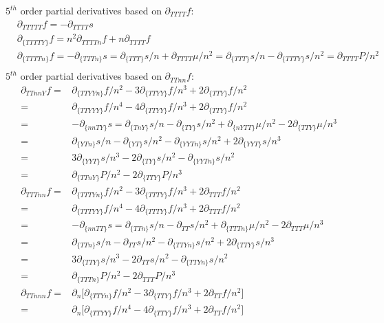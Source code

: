 \documentclass[11pt,letter]{article}
\begin{document}
$5^{th}$ order partial derivatives based on $\partial_{TTTT}f$:
\begin{equation}
 \begin{split}
  &\partial_{TTTTT}f=-\partial_{TTTT}s\\
  &\partial_{\{TTTTY\}}f=n^2\partial_{TTTTn}f+n\partial_{TTTT}f\\
  &\partial_{\{TTTTn\}}f=-\partial_{\{TTTn\}}s=\partial_{\{TTT\}}s/n+\partial_{TTTT}\mu/n^2=\partial_{\{TTT\}}s/n-\partial_{\{TTTY\}}s/n^2=\partial_{TTTT}P/n^2\\
 \end{split}
\end{equation}
$5^{th}$ order partial derivatives based on $\partial_{TTnn}f$:
\begin{equation}
 \begin{split}
  \partial_{TTnnY}f=&\partial_{\{TTYYn\}}f/n^2-3\partial_{\{TTYY\}}f/n^3+2\partial_{\{TTY\}}f/n^2\\
  =&\partial_{\{TTYYY\}}f/n^4-4\partial_{\{TTYY\}}f/n^3+2\partial_{\{TTY\}}f/n^2\\
  =&-\partial_{\{nnTY\}}s=\partial_{\{TnY\}}s/n-\partial_{\{TY\}}s/n^2+\partial_{\{nYTT\}}\mu/n^2-2\partial_{\{TTY\}}\mu/n^3\\
  =&\partial_{\{YTn\}}s/n-\partial_{\{YT\}}s/n^2-\partial_{\{YYTn\}}s/n^2+2\partial_{\{YYT\}}s/n^3\\
  =&3\partial_{\{YYT\}}s/n^3-2\partial_{\{TY\}}s/n^2-\partial_{\{YYTn\}}s/n^2\\
  =&\partial_{\{TTnY\}}P/n^2-2\partial_{\{TTY\}}P/n^3\\
  \partial_{TTTnn}f=&\partial_{\{TTTYn\}}f/n^2-3\partial_{\{TTTY\}}f/n^3+2\partial_{TTT}f/n^2\\
  =&\partial_{\{TTTYY\}}f/n^4-4\partial_{\{TTTY\}}f/n^3+2\partial_{TTT}f/n^2\\
  =&-\partial_{\{nnTT\}}s=\partial_{\{TTn\}}s/n-\partial_{TT}s/n^2+\partial_{\{TTTn\}}\mu/n^2-2\partial_{TTT}\mu/n^3\\
  =&\partial_{\{TTn\}}s/n-\partial_{TT}s/n^2-\partial_{\{TTYn\}}s/n^2+2\partial_{\{TTY\}}s/n^3\\
  =&3\partial_{\{TTY\}}s/n^3-2\partial_{TT}s/n^2-\partial_{\{TTYn\}}s/n^2\\
  =&\partial_{\{TTTn\}}P/n^2-2\partial_{TTT}P/n^3\\
  \partial_{TTnnn}f=&\partial_{n}\big[\partial_{\{TTYn\}}f/n^2-3\partial_{\{TTY\}}f/n^3+2\partial_{TT}f/n^2\big]\\
  =&\partial_{n} \big[\partial_{\{TTYY\}}f/n^4-4\partial_{\{TTY\}}f/n^3+2\partial_{TT}f/n^2\big]\\

\end{split}
\end{equation}
\end{document}
